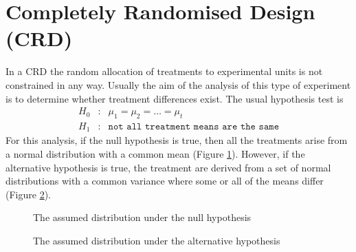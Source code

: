\documentclass[a4paper, 10pt, fleqn, twosided]{memoir}
\begin{document}
\section{Completely Randomised Design (CRD)}
In a CRD the random allocation of treatments to experimental units is not constrained in any way. Usually the aim of
the analysis of this type of experiment is to determine whether treatment differences exist. The usual hypothesis test
is
\begin{eqnarray*}
	H_0&:& \mu_1 = \mu_2 = \hdots = \mu_t \\
	H_1&:& \texttt{not all treatment means are the same}
\end{eqnarray*}
For this analysis, if the null hypothesis is true, then all the treatments arise from a normal distribution with a
common mean (Figure \ref{fig:crdnull}). However, if the alternative hypothesis is true, the treatment are derived from
a set of normal distributions with a common variance where some or all of the means differ (Figure \ref{fig:crdalt}).
\begin{figure}[!hbtp]
\centering
{}
\caption{The assumed distribution under the null hypothesis}
\label{fig:crdnull}
\end{figure}
\clearpage
\begin{figure}[!hbtp]
\centering
{}
\caption{The assumed distribution under the alternative hypothesis}
\label{fig:crdalt}
\end{figure}
\end{document}
